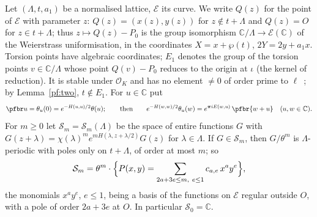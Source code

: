 \documentclass[10pt]{amsart}
\theoremstyle{definition}
\theoremstyle{remark}
\newcommand{\C}{\mathbb C}
\providecommand{\auO}{\mathcal O}
\begin{document}
Let $(\Lambda,t,a_1)$ be a normalised lattice, $\mathcal E$ its curve. We write $Q(z)$ for the
point of $\mathcal E$ with parameter $z$: $Q(z)=(x(z),y(z))$ for $z\notin t+\Lambda$ and $Q(z)=O$
for $z\in t+\Lambda$; thus $z\mapsto Q(z)-P_0$ is the group isomorphism $\C/\Lambda\to\mathcal
E(\C)$ of the Weierstrass uniformisation, in the coordinates $X=x+\wp(t)$, $2Y=2y+a_1x$. Torsion
points have algebraic coordinates; $E_1$ denotes the group of the torsion points $v\in\C/\Lambda$
whose point $Q(v)-P_0$ reduces to the origin at $\iota$ (the kernel of reduction). It is stable
under $\auO_K$ and has no element $\ne0$ of order prime to $\ell$~\cite[Chapter~VII, Proposition~3.1(a)]{SilvermanAEC}; by
Lemma~\ref{pf:two}, $t\notin E_1$. For $u\in\C$ put
\[
\pfbr u=\theta_u(0)=e^{-H(u,u)/2}\theta(u);\qquad\text{then}\qquad e^{-H(w,w)/2}\theta_u(w)=
e^{\boldsymbol\pi iE(w,u)}\,\pfbr{w+u}\quad(u,w\in\C).
\]
For $m\ge0$ let $\mathcal S_m=\mathcal S_m(\Lambda)$ be the space of entire functions $G$ with
$G(z+\lambda)=\chi(\lambda)^me^{mH(\lambda,z+\lambda/2)}G(z)$ for $\lambda\in\Lambda$. If
$G\in\mathcal S_m$, then $G/\theta^m$ is $\Lambda$-periodic with poles only on $t+\Lambda$, of
order at most $m$; so
\begin{equation}\label{pf:eq-sections}
\mathcal S_m=\theta^m\cdot\Bigl\{P(x,y)=\sum_{2a+3e\le m,\ e\le1}c_{a,e}\,x^ay^e\Bigr\},
\end{equation}
the monomials $x^ay^e$, $e\le1$, being a basis of the functions on $\mathcal E$ regular outside
$O$, with a pole of order $2a+3e$ at $O$. In particular $\mathcal S_0=\C$.
\end{document}

